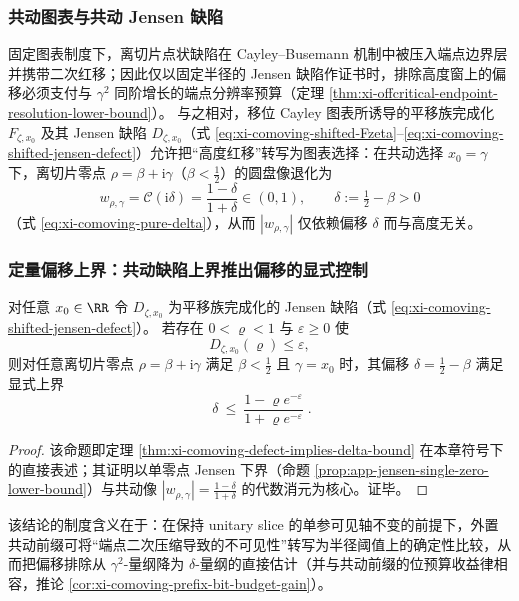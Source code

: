 \subsubsection{共动图表与共动 Jensen 缺陷}
固定图表制度下，离切片点状缺陷在 Cayley--Busemann 机制中被压入端点边界层并携带二次红移；因此仅以固定半径的 Jensen 缺陷作证书时，排除高度窗上的偏移必须支付与 \(\gamma^2\) 同阶增长的端点分辨率预算（定理 \ref{thm:xi-offcritical-endpoint-resolution-lower-bound}）。
与之相对，移位 Cayley 图表所诱导的平移族完成化 \(F_{\zeta,x_0}\) 及其 Jensen 缺陷 \(D_{\zeta,x_0}\)（式 \eqref{eq:xi-comoving-shifted-Fzeta}--\eqref{eq:xi-comoving-shifted-jensen-defect}）允许把“高度红移”转写为图表选择：在共动选择 \(x_0=\gamma\) 下，离切片零点 \(\rho=\beta+\mathrm{i}\gamma\)（\(\beta<\tfrac12\)）的圆盘像退化为
\[
w_{\rho,\gamma}=\mathcal{C}(\mathrm{i}\delta)=\frac{1-\delta}{1+\delta}\in(0,1),
\qquad
\delta:=\tfrac12-\beta>0
\]
（式 \eqref{eq:xi-comoving-pure-delta}），从而 \(|w_{\rho,\gamma}|\) 仅依赖偏移 \(\delta\) 而与高度无关。

\subsubsection{定量偏移上界：共动缺陷上界推出偏移的显式控制}
\begin{proposition}[共动缺陷界导出无高度偏移界]\label{prop:cdim-comoving-defect-implies-delta-bound}
对任意 \(x_0\in\RR\) 令 \(D_{\zeta,x_0}\) 为平移族完成化的 Jensen 缺陷（式 \eqref{eq:xi-comoving-shifted-jensen-defect}）。
若存在 \(0<\varrho<1\) 与 \(\varepsilon\ge 0\) 使
\[
D_{\zeta,x_0}(\varrho)\le \varepsilon,
\]
则对任意离切片零点 \(\rho=\beta+\mathrm{i}\gamma\) 满足 \(\beta<\tfrac12\) 且 \(\gamma=x_0\) 时，其偏移 \(\delta=\tfrac12-\beta\) 满足显式上界
\[
\boxed{\;
\delta\ \le\ \frac{1-\varrho e^{-\varepsilon}}{1+\varrho e^{-\varepsilon}}\; }.
\]
\end{proposition}
\begin{proof}
该命题即定理 \ref{thm:xi-comoving-defect-implies-delta-bound} 在本章符号下的直接表述；其证明以单零点 Jensen 下界（命题 \ref{prop:app-jensen-single-zero-lower-bound}）与共动像 \(|w_{\rho,\gamma}|=\frac{1-\delta}{1+\delta}\) 的代数消元为核心。证毕。
\end{proof}
该结论的制度含义在于：在保持 unitary slice 的单参可见轴不变的前提下，外置共动前缀可将“端点二次压缩导致的不可见性”转写为半径阈值上的确定性比较，从而把偏移排除从 \(\gamma^2\)-量纲降为 \(\delta\)-量纲的直接估计（并与共动前缀的位预算收益律相容，推论 \ref{cor:xi-comoving-prefix-bit-budget-gain}）。

